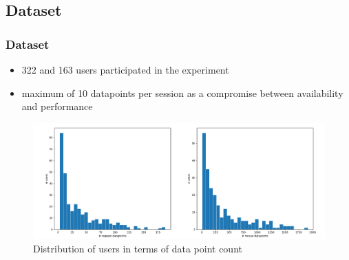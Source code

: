 \documentclass[t,aspectratio=169,table]{beamer}
\begin{document}
\subsection{Dataset}
\begin{frame}
\frametitle{Dataset}

\begin{itemize}
    \item 322 and 163 users participated in the experiment
    \item maximum of 10 datapoints per session as a compromise between availability and performance
\end{itemize}

\begin{figure}[h]
    \includegraphics[width=\textwidth]{figures/user_dp_hist.png}
    \caption{Distribution of users in terms of data point count}
    \label{fig:user_dp_hist}
\end{figure}

\end{frame}
\end{document}
